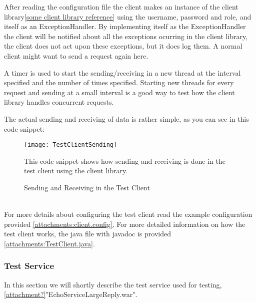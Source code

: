             After reading the configuration file the client makes an instance of the client library\ref{some client library reference} 
            using the username, password and role, and itself as an ExceptionHandler. By implementing itself as the ExceptionHandler the client will be notified about all the exceptions ocurring in the client library, the client does not act upon these exceptions, but it does log them. A normal client might want to send a request again here.
            
            A timer is used to start the sending/receiving in a new thread at the interval specified and the number of times specified. Starting new threads for every request and sending at a small interval is a good way to test how the client library handles concurrent requests.

            The actual sending and receiving of data is rather simple, as you can see in this code snippet:
            \begin{figure}[h]
                \centering
                \texttt{[image: TestClientSending]}
                \caption{Sending and Receiving in the Test Client}
                This code snippet shows how sending and receiving is done in the test client using the client library.
                \label{fig:TestClientSending}
            \end{figure}
            \\
            For more details about configuring the test client read the example configuration provided \ref{attachments:client.config}. For more detailed information on how the test client works, the java file with javadoc is provided \ref{attachments:TestClient.java}.

        \subsubsection{Test Service}\label{Testing:About:Service}
            In this section we will shortly describe the test service used for testing, \ref{attachment?}"EchoServiceLargeReply.war".

